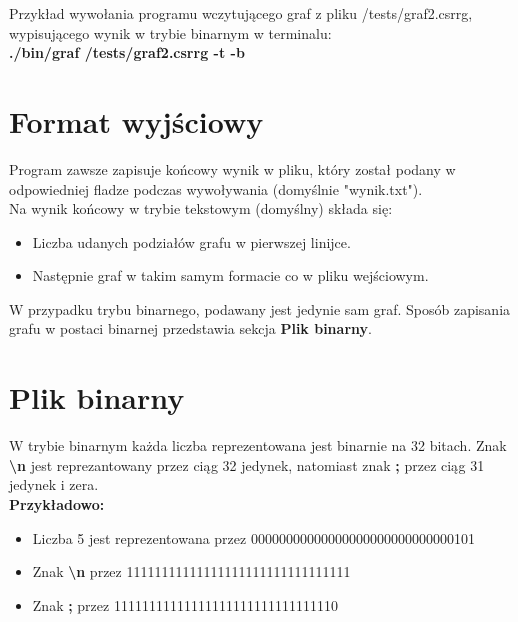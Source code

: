 \documentclass{article}
\begin{document}
Przykład wywołania programu wczytującego graf z pliku /tests/graf2.csrrg, wypisującego wynik w trybie binarnym w terminalu:\\
\textbf{./bin/graf /tests/graf2.csrrg -t -b}

\section*{Format wyjściowy}
Program zawsze zapisuje końcowy wynik w pliku, który został podany w odpowiedniej fladze podczas wywoływania (domyślnie "wynik.txt").\\

Na wynik końcowy w trybie tekstowym (domyślny) składa się:
\begin{itemize}
    \item Liczba udanych podziałów grafu w pierwszej linijce.

    \item Następnie graf w takim samym formacie co w pliku wejściowym.
\end{itemize}

W przypadku trybu binarnego, podawany jest jedynie sam graf. Sposób zapisania grafu w postaci binarnej przedstawia sekcja \textbf{Plik binarny}.

\section*{Plik binarny}
W trybie binarnym każda liczba reprezentowana jest binarnie na 32 bitach. Znak \textbf{\textbackslash n} jest reprezantowany przez ciąg 32 jedynek, natomiast znak \textbf{;} przez ciąg 31 jedynek i zera.\\

\textbf{Przykładowo:}

\begin{itemize}
  \item Liczba 5 jest reprezentowana przez 00000000000000000000000000000101
  \item Znak \textbf{\textbackslash n} przez 11111111111111111111111111111111
  \item Znak \textbf{;} przez 11111111111111111111111111111110
\end{itemize}
\end{document}

